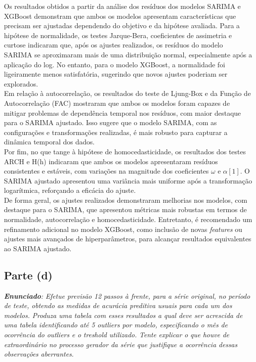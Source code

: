 \documentclass[a4paper, 12pt]{article}
\begin{document}
Os resultados obtidos a partir da análise dos resíduos dos modelos SARIMA e XGBoost demonstram que ambos os modelos apresentam características que precisam ser ajustadas dependendo do objetivo e da hipótese avaliada. Para a hipótese de normalidade, os testes Jarque-Bera, coeficientes de assimetria e curtose indicaram que, após os ajustes realizados, os resíduos do modelo SARIMA se aproximaram mais de uma distribuição normal, especialmente após a aplicação do log. No entanto, para o modelo XGBoost, a normalidade foi ligeiramente menos satisfatória, sugerindo que novos ajustes poderiam ser explorados.\\

Em relação à autocorrelação, os resultados do teste de Ljung-Box e da Função de Autocorrelação (FAC) mostraram que ambos os modelos foram capazes de mitigar problemas de dependência temporal nos resíduos, com maior destaque para o SARIMA ajustado. Isso sugere que o modelo SARIMA, com as configurações e transformações realizadas, é mais robusto para capturar a dinâmica temporal dos dados.\\

Por fim, no que tange à hipótese de homocedasticidade, os resultados dos testes ARCH e H(h) indicaram que ambos os modelos apresentaram resíduos consistentes e estáveis, com variações na magnitude dos coeficientes $\omega$ e $\alpha[1]$. O SARIMA ajustado apresentou uma variância mais uniforme após a transformação logarítmica, reforçando a eficácia do ajuste.\\

De forma geral, os ajustes realizados demonstraram melhorias nos modelos, com destaque para o SARIMA, que apresentou métricas mais robustas em termos de normalidade, autocorrelação e homocedasticidade. Entretanto, é recomendado um refinamento adicional no modelo XGBoost, como inclusão de novas \textit{features} ou ajustes mais avançados de hiperparâmetros, para alcançar resultados equivalentes ao SARIMA ajustado.


\subsection{Parte (d)}

\textit{\textbf{Enunciado}: Efetue previsão 12 passos à frente, para a série original, no período de teste, obtendo as medidas de acurácia preditiva usuais para cada um dos modelos. Produza uma tabela com esses resultados a qual deve ser acrescida de uma tabela identificando até 5 outliers por modelo, especificando o mês de ocorrência do outliers e o treshold utilizado. Tente explicar o que houve de extraordinário no processo gerador da série que justifique a ocorrência dessas observações aberrantes.}\\
\end{document}
